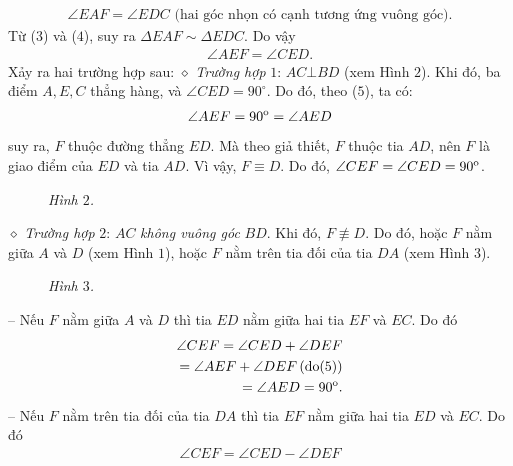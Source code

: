 \begin{multicols}{2}
	\begin{align*}
		\angle EAF = \angle EDC \text{ (hai góc nhọn có cạnh tương ứng vuông góc).} \tag{$4$}
	\end{align*}
	Từ ($3$) và ($4$), suy ra $\Delta EAF \sim  \Delta EDC$. Do vậy
	\begin{align*}
		\angle AEF = \angle CED. \tag{$5$}
	\end{align*}
	Xảy ra hai trường hợp sau:
	\vskip 0.05cm
	$\diamond$ \textit{Trường hợp} $1$: $AC \bot  BD$ (xem Hình $2$).
	\vskip 0.05cm
	Khi đó, ba điểm $A, E, C$ thẳng hàng, và $\angle CED = 90^\circ$.  Do đó, theo ($5$), ta có:
	\begin{align*}
		\angle AEF = {90^{\rm{o}}} = \angle AED
	\end{align*}
	suy ra, $F$ thuộc đường thẳng $ED$. Mà theo giả thiết, $F$ thuộc tia $AD$, nên $F$ là giao điểm của $ED$ và tia $AD$. Vì vậy, $F \equiv D$.  Do đó,  
	$\angle CEF = \angle CED = {90^{\rm{o}}}$.
	\begin{figure}[H]
		\vspace*{-5pt}
		\centering
		\captionsetup{labelformat= empty, justification=centering}
		\caption{\small\textit{\color{thachthuctoanhoc}Hình $2$.}}
		\vspace*{-10pt}
	\end{figure}
	$\diamond$ \textit{Trường hợp} $2$: $AC$ \textit{không vuông góc} $BD$.
	\vskip 0.05cm
	Khi đó, $F \not\equiv D$.  Do đó, hoặc $F$ nằm giữa $A$ và $D$ (xem Hình $1$), hoặc $F$ nằm trên tia đối của tia $DA $ (xem Hình $3$).
	\begin{figure}[H]
		\vspace*{-5pt}
		\centering
		\captionsetup{labelformat= empty, justification=centering}
		\caption{\small\textit{\color{thachthuctoanhoc}Hình $3$.}}
		\vspace*{-10pt}
	\end{figure}
	-- Nếu $F$ nằm giữa $A$ và $D$ thì tia $ED$ nằm giữa hai tia $EF$ và $EC$. Do đó
	\begin{align*}
			\angle CEF = \angle CED + \angle DEF\\
			 = \angle AEF + \angle DEF\left( {{\rm{do}}(5)} \right)\\
			 = \angle AED = {90^{\rm{o}}}.
	\end{align*}
	-- Nếu $F$ nằm trên tia đối của tia $DA$ thì tia $EF$ nằm giữa hai tia $ED$ và $EC$. Do đó
	\begin{align*}
			\angle CEF = \angle CED - \angle DEF\\

\end{align*}
\end{multicols}
